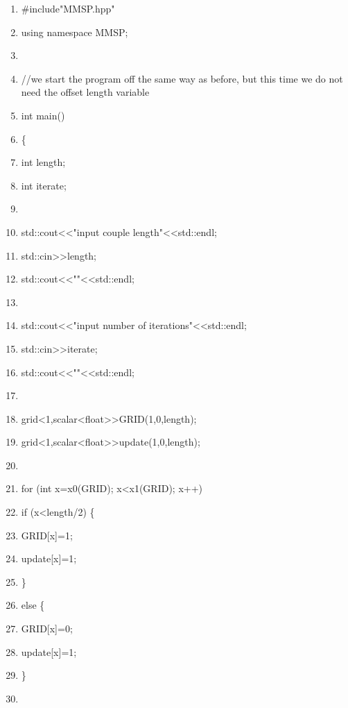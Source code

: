 \documentclass[10pt]{article}
\begin{document}
\begin{shadebox}
\begin{enumerate} \itemsep1pt \parskip0pt 
\item \#include"MMSP.hpp"
\item using namespace MMSP; 
\item 
\item //we start the program off the same way as before, but this time we do not need the offset length variable
\item int main() 
\item \{ 
\item int length;
\item int iterate;
\item 
\item std::cout\textless \textless "input couple length"\textless \textless std::endl;
\item std::cin\textgreater \textgreater length;
\item std::cout\textless \textless ""\textless \textless std::endl;
\item 
\item std::cout\textless \textless "input number of iterations"\textless \textless std::endl;
\item std::cin\textgreater \textgreater iterate;
\item std::cout\textless \textless ""\textless \textless std::endl;
\item 
\item grid\textless 1,scalar\textless float\textgreater  \textgreater  GRID(1,0,length);
\item grid\textless 1,scalar\textless float\textgreater  \textgreater  update(1,0,length); 
\item 
\item for (int x=x0(GRID); x\textless x1(GRID); x++)
\item \hspace{10pt}         if (x\textless length/2) \{ 
\item \hspace{10pt} \hspace{10pt}                 GRID[x]=1;
\item \hspace{10pt} \hspace{10pt}                 update[x]=1;  
\item \hspace{10pt}         \}           
\item \hspace{10pt}         else \{
\item \hspace{10pt} \hspace{10pt}                 GRID[x]=0;
\item \hspace{10pt} \hspace{10pt}                 update[x]=1;
\item         \}
\item 
\end{enumerate}
\end{shadebox}
\end{document}
